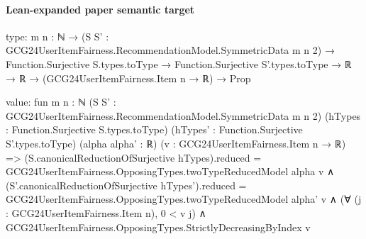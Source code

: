 \documentclass[10pt]{article}
\begin{document}
\paragraph{Lean-expanded paper semantic target}
\begin{ReviewVerbatim}
type:
{m n : ℕ} →
  (S S' : GCG24UserItemFairness.RecommendationModel.SymmetricData m n 2) →
    Function.Surjective S.types.toType →
      Function.Surjective S'.types.toType → ℝ → ℝ → (GCG24UserItemFairness.Item n → ℝ) → Prop

value:
fun {m n : ℕ} (S S' : GCG24UserItemFairness.RecommendationModel.SymmetricData m n 2)
    (hTypes : Function.Surjective S.types.toType) (hTypes' : Function.Surjective S'.types.toType) (alpha alpha' : ℝ)
    (v : GCG24UserItemFairness.Item n → ℝ) =>
  (S.canonicalReductionOfSurjective hTypes).reduced = GCG24UserItemFairness.OpposingTypes.twoTypeReducedModel alpha v ∧
    (S'.canonicalReductionOfSurjective hTypes').reduced =
        GCG24UserItemFairness.OpposingTypes.twoTypeReducedModel alpha' v ∧
      (∀ (j : GCG24UserItemFairness.Item n), 0 < v j) ∧ GCG24UserItemFairness.OpposingTypes.StrictlyDecreasingByIndex v
\end{ReviewVerbatim}
\end{document}
